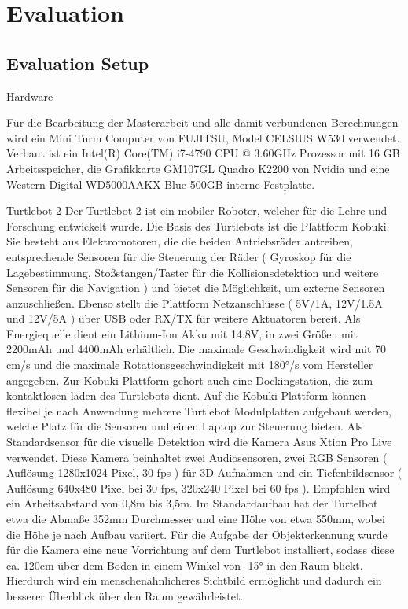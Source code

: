 \chapter{Evaluation}
\label{sec:eval}

\section{Evaluation Setup}
\label{sec:evalsetup}









Hardware 


Für die Bearbeitung der Masterarbeit und alle damit verbundenen Berechnungen wird ein Mini Turm Computer von FUJITSU, Model CELSIUS W530 verwendet. Verbaut ist ein Intel(R) Core(TM) i7-4790 CPU @ 3.60GHz Prozessor mit 16 GB Arbeitsspeicher, die Grafikkarte GM107GL Quadro K2200 von Nvidia und eine Western Digital WD5000AAKX Blue 500GB interne Festplatte. 

Turtlebot 2
Der Turtlebot 2 ist ein mobiler Roboter, welcher für die Lehre und Forschung entwickelt wurde. Die Basis des Turtlebots ist die Plattform Kobuki. Sie besteht aus Elektromotoren, die die beiden Antriebsräder antreiben, entsprechende Sensoren für die Steuerung der Räder ( Gyroskop für die Lagebestimmung, Stoßstangen/Taster für die Kollisionsdetektion und weitere Sensoren für die Navigation )  und bietet die Möglichkeit, um externe Sensoren anzuschließen. Ebenso stellt die Plattform Netzanschlüsse ( 5V/1A, 12V/1.5A und 12V/5A ) über USB oder RX/TX für weitere Aktuatoren bereit. Als Energiequelle dient ein Lithium-Ion Akku mit 14,8V, in zwei Größen mit 2200mAh und 4400mAh erhältlich. Die maximale Geschwindigkeit wird mit 70 cm/s und die maximale Rotationsgeschwindigkeit mit 180°/s vom Hersteller angegeben. Zur Kobuki Plattform gehört auch eine Dockingstation, die zum kontaktlosen laden des Turtlebots dient.
Auf die Kobuki Plattform können flexibel je nach Anwendung mehrere Turtlebot Modulplatten aufgebaut werden, welche Platz für die Sensoren und einen Laptop zur Steuerung bieten. Als Standardsensor für die visuelle Detektion wird die Kamera Asus Xtion Pro Live verwendet. Diese Kamera beinhaltet zwei Audiosensoren, zwei RGB Sensoren ( Auflösung 1280x1024 Pixel, 30 fps ) für 3D Aufnahmen und ein Tiefenbildsensor ( Auflösung 640x480 Pixel bei 30 fps, 320x240 Pixel bei 60 fps ). Empfohlen wird ein Arbeitsabstand von 0,8m bis 3,5m.
Im Standardaufbau hat der Turtelbot etwa die Abmaße 352mm Durchmesser und eine Höhe von etwa 550mm, wobei die Höhe je nach Aufbau variiert.
Für die Aufgabe der Objekterkennung wurde für die Kamera eine neue Vorrichtung auf dem Turtlebot installiert, sodass diese ca. 120cm über dem Boden in einem Winkel von -15° in den Raum blickt. Hierdurch wird ein menschenähnlicheres Sichtbild ermöglicht und dadurch ein besserer Überblick über den Raum gewährleistet. 

